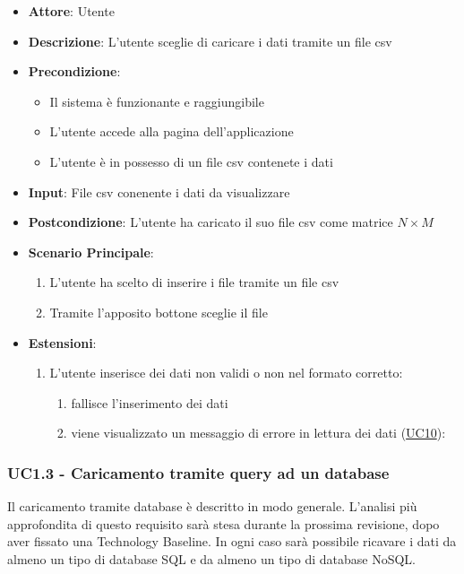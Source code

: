     \begin{itemize}
    \item \textbf{Attore}: Utente
    \item \textbf{Descrizione}: L'utente sceglie di caricare i dati tramite un file csv
    \item \textbf{Precondizione}:
    \begin{itemize}
        \item Il sistema è funzionante e raggiungibile
        \item L'utente accede alla pagina dell'applicazione
        \item L'utente è in possesso di un file csv contenete i dati
    \end{itemize}
    \item \textbf{Input}: File csv conenente i dati da visualizzare
    \item \textbf{Postcondizione}: L'utente ha caricato il suo file csv come matrice $N\times M$
    \item \textbf{Scenario Principale}: 
        \begin{enumerate}
            \item L'utente ha scelto di inserire i file tramite un file csv
            \item Tramite l'apposito bottone sceglie il file
        \end{enumerate}
        \item \textbf{Estensioni}:
        \begin{enumerate}
            \item L'utente inserisce dei dati non validi o non nel formato corretto:
                \begin{enumerate}
                    \item fallisce l'inserimento dei dati
                    \item viene visualizzato un messaggio di errore in lettura dei dati (\hyperref[uc10]{UC10}):
                \end{enumerate}
        \end{enumerate}  
    \end{itemize}

    
    \subsubsection{UC1.3 - Caricamento tramite query ad un database}
    \label{uc1.3}
    
    Il caricamento tramite database è descritto in modo generale. L'analisi più approfondita di questo requisito sarà stesa durante la prossima revisione, dopo aver fissato una Technology Baseline. In ogni caso sarà possibile ricavare i dati da almeno un tipo di database SQL e da almeno un tipo di database NoSQL.
    
